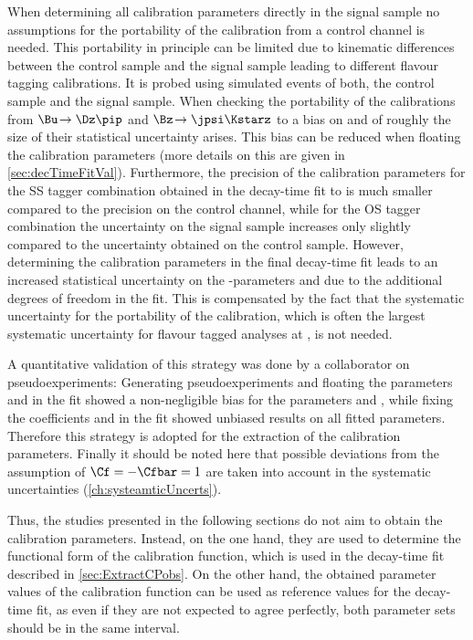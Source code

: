 When determining all calibration parameters directly in the signal sample no assumptions for the portability of the calibration from a control channel is needed.
This portability in principle can be limited due to kinematic differences between the control sample and the signal sample leading to different flavour tagging calibrations.
It is probed using simulated events of both, the control sample and the signal sample.
When checking the portability of the calibrations from $\Bu\!\to\Dz\pip$ and $\Bz\!\to\jpsi\Kstarz$ to \BdToDpi a bias on \Sf and \Sfbar of roughly the size of their statistical uncertainty arises.
This bias can be reduced when floating the calibration parameters (more details on this are given in \cref{sec:decTimeFitVal}).
Furthermore, the precision of the calibration parameters for the SS tagger combination obtained in the decay-time fit to \mbox{\BdToDpi} is much smaller compared to the precision on the control channel, while for the OS tagger combination the uncertainty on the signal sample increases only slightly compared to the uncertainty obtained on the control sample.
However, determining the calibration parameters in the final decay-time fit leads to an increased statistical uncertainty on the \CP-parameters \Sf and \Sfbar due to the additional degrees of freedom in the fit.
This is compensated by the fact that the systematic uncertainty for the portability of the calibration, which is often the largest systematic uncertainty for flavour tagged analyses at \lhcb, is not needed.

A quantitative validation of this strategy was done by a collaborator on pseudoexperiments:
Generating pseudoexperiments and floating the parameters \Cf and \Cfbar in the fit showed a non-negligible bias for the parameters \Sf and \Sfbar, while fixing the coefficients \Cf and \Cfbar in the fit showed unbiased results on all fitted parameters.
Therefore this strategy is adopted for the extraction of the calibration parameters.
Finally it should be noted here that possible deviations from the assumption of $\Cf=-\Cfbar=1$ are taken into account in the systematic uncertainties (\cref{ch:systeamticUncerts}).

Thus, the studies presented in the following sections do not aim to obtain the calibration parameters.
Instead, on the one hand, they are used to determine the functional form of the calibration function, which is used in the decay-time fit described in \cref{sec:ExtractCPobs}.
On the other hand, the obtained parameter values of the calibration function can be used as reference values for the decay-time fit, as even if they are not expected to agree perfectly, both parameter sets should be in the same interval.

